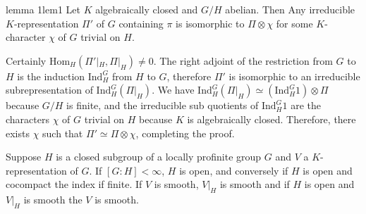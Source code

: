 \documentclass{article}
\begin{document}
\begin{lem}{lemma 1}{lem1}
    Let $K$ algebraically closed and \(G/H\) abelian. Then Any irreducible \(K\)-representation \(\Pi'\) of
    \(G\) containing \(\pi\) is isomorphic to \(\Pi \otimes \chi\) for some \(K\)-character \(\chi\) of \(G\) trivial on \(H\).
\end{lem}

\begin{Proof}
    Certainly \(\mathrm{Hom}_H(\Pi'|_H, \Pi|_H) \neq 0\). The right adjoint
    of the restriction from \(G\) to \(H\) is the induction \(\mathrm{Ind}_H^G\) from \(H\) to \(G\),
    therefore \(\Pi'\) is isomorphic to an irreducible subrepresentation of \(\mathrm{Ind}_H^G(\Pi|_H)\). We
    have \(\mathrm{Ind}_H^G(\Pi|_H) \simeq (\mathrm{Ind}_H^G 1) \otimes \Pi\) because \(G/H\) is finite, and
    the irreducible sub quotients of \(\mathrm{Ind}_H^G 1\) are the characters \(\chi\) of \(G\) trivial on
    \(H\) because \(K\) is algebraically closed. Therefore, there exists \(\chi\) such that \(\Pi' \simeq
    \Pi\otimes \chi\), completing the proof.
\end{Proof}

Suppose $H$ is a closed subgroup of a locally profinite group $G$ and $V$ a $K$-representation of $G$.
If $[G:H]<\infty$, $H$ is open, and conversely if $H$ is open and cocompact the index if finite. If $V$ is
smooth, $V|_H$ is smooth and if $H$ is open and $V|_H$ is smooth the $V$ is smooth.
\end{document}

